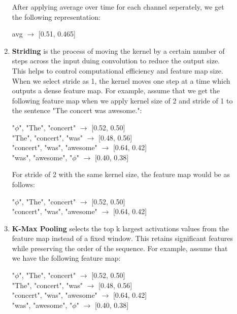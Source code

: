 \documentclass[10pt]{article}
\begin{document}
\begin{description}
\begin{enumerate}
        After applying average over time for each channel seperately, we get the following representation:

        \begin{center}
            avg $\rightarrow$ [0.51, 0.465] \\
        \end{center}

        \item \textbf{Striding} is the process of moving the kernel by a certain number of steps across the input duing convolution to reduce the output size.
        This helps to control computational efficiency and feature map size. When we select stride as 1, the kernel moves one step at a time which outputs a dense feature map.
        For example, assume that we get the following feature map when we apply kernel size of 2 and stride of 1 to the sentence "The concert was awesome.":

        \begin{center}
            "$\phi$", "The", "concert" $\rightarrow$ [0.52, 0.50] \\
            "The", "concert", "was" $\rightarrow$ [0.48, 0.56] \\
            "concert", "was", "awesome" $\rightarrow$ [0.64, 0.42] \\
            "was", "awesome", "$\phi$" $\rightarrow$ [0.40, 0.38]
        \end{center}

        For stride of 2 with the same kernel size, the feature map would be as follows:

        \begin{center}
            "$\phi$", "The", "concert" $\rightarrow$ [0.52, 0.50] \\
            "concert", "was", "awesome" $\rightarrow$ [0.64, 0.42]
        \end{center}

        \item \textbf{K-Max Pooling} selects the top k largest activations values from the feature map instead of a fixed window. 
        This retains significant features while preserving the order of the sequence. For example, assume that we have the following feature map:

        \begin{center}
            "$\phi$", "The", "concert" $\rightarrow$ [0.52, 0.50] \\
            "The", "concert", "was" $\rightarrow$ [0.48, 0.56] \\
            "concert", "was", "awesome" $\rightarrow$ [0.64, 0.42] \\
            "was", "awesome", "$\phi$" $\rightarrow$ [0.40, 0.38]
        \end{center}


\end{enumerate}
\end{description}
\end{document}
